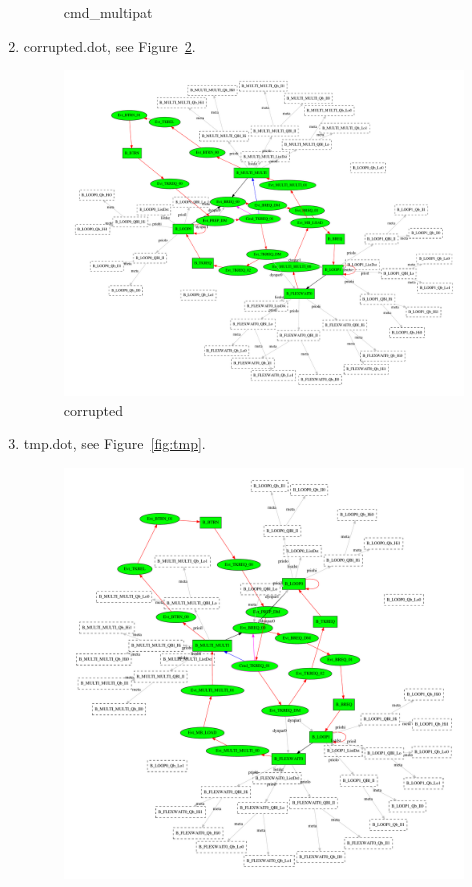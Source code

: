 \documentclass[12pt,a4paper]{report}
\begin{document}
\begin{enumerate}
\begin{figure}
        \caption{cmd\_multipat}
        \label{fig:cmd_multipat}
    \end{figure}
\item corrupted.dot, see Figure~\ref{fig:corrupted}.
    \begin{figure}
        \centering
        \includegraphics*[width=1.0\textwidth,keepaspectratio]{TestPattern/corrupted.pdf}
        \caption{corrupted}
        \label{fig:corrupted}
    \end{figure}
\item tmp.dot, see Figure~\ref{fig:tmp}.
    \begin{figure}
        \centering
        \includegraphics*[width=1.0\textwidth,keepaspectratio]{TestPattern/tmp.pdf}

\end{figure}
\end{enumerate}
\end{document}
